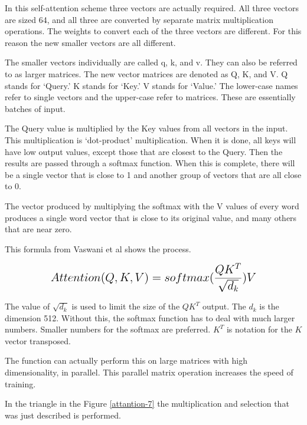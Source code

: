In this self-attention scheme three vectors are actually required. All three vectors are sized 64, and all three are converted by separate matrix multiplication operations. The weights to convert each of the three vectors are different. For this reason the new smaller vectors are all different.

The smaller vectors individually are called q, k, and v. They can also be referred to as larger matrices. The new vector matrices are denoted as Q, K, and V. Q stands for `Query.' K stands for `Key.' V stands for `Value.' The lower-case names refer to single vectors and the upper-case refer to matrices. These are essentially batches of input.

The Query value is multiplied by the Key values from all vectors in the input. This multiplication is `dot-product' multiplication. When it is done, all keys will have low output values, except those that are closest to the Query. Then the results are passed through a softmax function. When this is complete, there will be a single vector that is close to 1 and another group of vectors that are all close to 0.

The vector produced by multiplying the softmax with the V values of every word produces a single word vector that is close to its original value, and many others that are near zero.

This formula from Vaswani et al \cite{Vaswani2017AttentionIA} shows the process.

$$
\mathlarger{ \mathlarger{
Attention(Q,K,V)=softmax(\dfrac{QK^T}{\sqrt{d_k}})V
} }
$$

The value of $\sqrt{d_k}$ is used to limit the size of the $QK^T$ output. The $d_k$ is the dimension 512. Without this, the softmax function has to deal with much larger numbers. Smaller numbers for the softmax are preferred. $K^T$ is notation for the $K$ vector transposed.

The function can actually perform this on large matrices with high dimensionality, in parallel. This parallel matrix operation increases the speed of training.

In the triangle in the Figure \ref{attantion-7} the multiplication and selection that was just described is performed.

